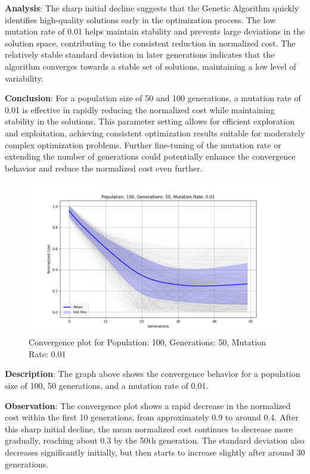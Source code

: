 \documentclass[
]{article}
\begin{document}
    \textbf{Analysis}: The sharp initial decline suggests that the Genetic Algorithm quickly identifies high-quality solutions early in the optimization process. The low mutation rate of 0.01 helps maintain stability and prevents large deviations in the solution space, contributing to the consistent reduction in normalized cost. The relatively stable standard deviation in later generations indicates that the algorithm converges towards a stable set of solutions, maintaining a low level of variability.

    \textbf{Conclusion}: For a population size of 50 and 100 generations, a mutation rate of 0.01 is effective in rapidly reducing the normalized cost while maintaining stability in the solutions. This parameter setting allows for efficient exploration and exploitation, achieving consistent optimization results suitable for moderately complex optimization problems. Further fine-tuning of the mutation rate or extending the number of generations could potentially enhance the convergence behavior and reduce the normalized cost even further.

    \begin{figure}[H]
        \centering
        \includegraphics[width=\textwidth]{genetic_algorithm/Population_100_Generations_50_MutationRate_0.01}
        \caption{Convergence plot for Population: 100, Generations: 50, Mutation Rate: 0.01}
        \label{fig:ga_100_50_01}
    \end{figure}

    \textbf{Description}: The graph above shows the convergence behavior for a population size of 100, 50 generations, and a mutation rate of 0.01.

    \textbf{Observation}: The convergence plot shows a rapid decrease in the normalized cost within the first 10 generations, from approximately 0.9 to around 0.4. After this sharp initial decline, the mean normalized cost continues to decrease more gradually, reaching about 0.3 by the 50th generation. The standard deviation also decreases significantly initially, but then starts to increase slightly after around 30 generations.
\end{document}
